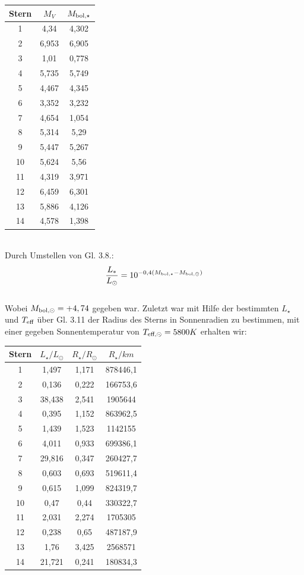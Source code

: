 \documentclass[12pt]{article}
\begin{document}
\newpage\noindent\begin{table}[!ht]
    \centering
    \begin{tabular}{c|c|c}
        Stern & $M_V$ & $M_{\textnormal{bol},\star}$ \\ \hline
        1 & 4,34 & 4,302 \\ 
        2 & 6,953 & 6,905 \\ 
        3 & 1,01 & 0,778 \\ 
        4 & 5,735 & 5,749 \\
        5 & 4,467 & 4,345 \\
        6 & 3,352 & 3,232 \\ 
        7 & 4,654 & 1,054 \\ 
        8 & 5,314 & 5,29 \\ 
        9 & 5,447 & 5,267 \\ 
        10 & 5,624 & 5,56 \\ 
        11 & 4,319 & 3,971 \\ 
        12 & 6,459 & 6,301 \\ 
        13 & 5,886 & 4,126 \\ 
        14 & 4,578 & 1,398 \\ 
    \end{tabular}
\end{table}\\
Durch Umstellen von Gl. 3.8.:
\[\frac{L_*}{L_{\odot}} = 10^{-0,4(M_{\textnormal{bol},\star}-M_{\textnormal{bol},\odot})}\]\\
Wobei $M_{\textnormal{bol},\odot} = +4,74$ gegeben war. Zuletzt war mit Hilfe der bestimmten $L_\star$ und $T_{\textnormal{eff}}$ über Gl. 3.11 der Radius des Sterns in Sonnenradien zu bestimmen, mit einer gegeben Sonnentemperatur von $T_{\textnormal{eff},\odot} = 5800K$ erhalten wir:
\begin{table}[!ht]
    \centering
    \begin{tabular}{c|c|c|c}
        Stern & $L_\star / L_\odot$ &$R_\star / R_\odot$& $R_\star / km$ \\ \hline
        1 & 1,497 & 1,171 & 878446,1 \\ 
        2 & 0,136 & 0,222 & 166753,6 \\ 
        3 & 38,438 & 2,541 & 1905644 \\ 
        4 & 0,395 & 1,152 & 863962,5 \\ 
        5 & 1,439 & 1,523 & 1142155 \\ 
        6 & 4,011 & 0,933 & 699386,1 \\ 
        7 & 29,816 & 0,347 & 260427,7 \\ 
        8 & 0,603 & 0,693 & 519611,4 \\ 
        9 & 0,615 & 1,099 & 824319,7 \\ 
        10 & 0,47 & 0,44 & 330322,7 \\ 
        11 & 2,031 & 2,274 & 1705305 \\ 
        12 & 0,238 & 0,65 & 487187,9 \\ 
        13 & 1,76 & 3,425 & 2568571 \\ 
        14 & 21,721 & 0,241 & 180834,3 \\ 
    \end{tabular}
\end{table}
\end{document}
